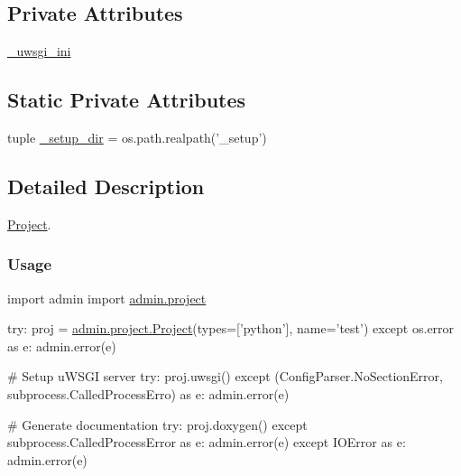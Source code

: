 \subsection*{Private Attributes}
\begin{DoxyCompactItemize}
\item 
\hyperlink{classadmin_1_1project_1_1Project_a4eda9f81ef1deebabdbba87fd8fe4c3a}{\-\_\-uwsgi\-\_\-ini}
\end{DoxyCompactItemize}
\subsection*{Static Private Attributes}
\begin{DoxyCompactItemize}
\item 
tuple \hyperlink{classadmin_1_1project_1_1Project_a71a8267ae4b09aa149a8af5e3263ca19}{\-\_\-setup\-\_\-dir} = os.\-path.\-realpath('\-\_\-setup')
\end{DoxyCompactItemize}


\subsection{Detailed Description}
\hyperlink{classadmin_1_1project_1_1Project}{Project}. 

\subsubsection*{Usage}


\begin{DoxyPre}{\ttfamily 
      import admin
      import \hyperlink{namespaceadmin_1_1project}{admin.project}}\end{DoxyPre}



\begin{DoxyPre}{\ttfamily       try:
          proj = \hyperlink{classadmin_1_1project_1_1Project}{admin.project.Project}(types=['python'], name='test')
      except os.error as e:
          admin.error(e)}\end{DoxyPre}



\begin{DoxyPre}{\ttfamily       \# Setup uWSGI server
      try:
          proj.uwsgi()
      except (ConfigParser.NoSectionError, subprocess.CalledProcessErro) as e:
          admin.error(e)}\end{DoxyPre}



\begin{DoxyPre}{\ttfamily       \# Generate documentation
      try:
          proj.doxygen()
      except subprocess.CalledProcessError as e:
          admin.error(e)
      except IOError as e:
          admin.error(e)
  }\end{DoxyPre}
 

